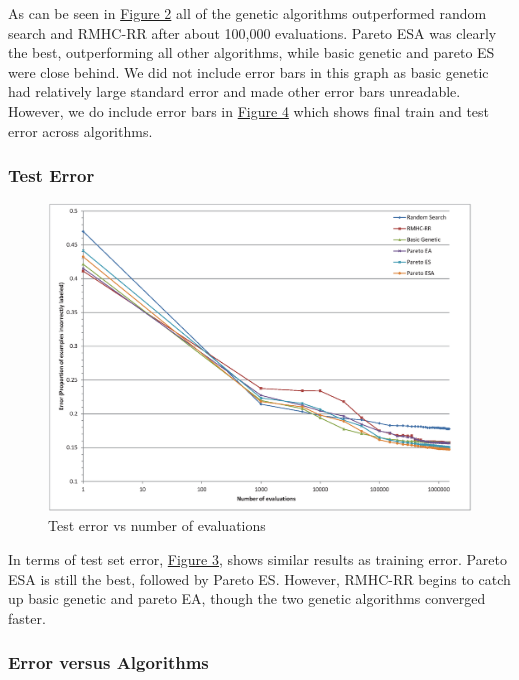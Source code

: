 \documentclass{acm_proc_article-sp}
\begin{document}
As can be seen in \hyperref[train]{Figure 2} all of the genetic algorithms outperformed random search and RMHC-RR after about 100,000 evaluations. Pareto ESA was clearly the best, outperforming all other algorithms, while basic genetic and pareto ES were close behind. We did not include error bars in this graph as basic genetic had relatively large standard error and made other error bars unreadable. However, we do include error bars in \hyperref[algorithms]{Figure 4} which shows final train and test error across algorithms.

\subsubsection{Test Error}

\begin{figure}[h]
\centering
\includegraphics[width=\linewidth]{test_chart.eps}
\caption{Test error vs number of evaluations}\label{test}
\end{figure}

In terms of test set error, \hyperref[test]{Figure 3}, shows similar results as training error. Pareto ESA is still the best, followed by Pareto ES. However, RMHC-RR begins to catch up basic genetic and pareto EA, though the two genetic algorithms converged faster.

\subsubsection{Error versus Algorithms}
\end{document}
